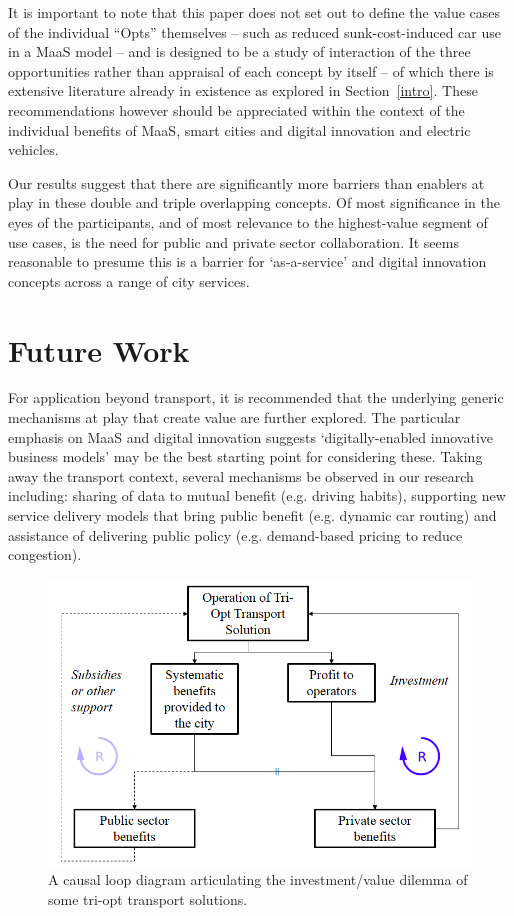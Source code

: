 \documentclass[b5paper,10pt]{article}
\begin{document}
It is important to note that this paper does not set out to define the
value cases of the individual ``Opts'' themselves -- such as reduced
sunk-cost-induced car use in a MaaS model -- and is designed to be a
study of interaction of the three opportunities rather than appraisal
of each concept by itself -- of which there is extensive literature
already in existence as explored in Section~\ref{intro}. These
recommendations however should be appreciated within the context of
the individual benefits of MaaS, smart cities and digital innovation
and electric vehicles.

Our results suggest that there are significantly more barriers than
enablers at play in these double and triple overlapping concepts. Of
most significance in the eyes of the participants, and of most
relevance to the highest-value segment of use cases, is the need for
public and private sector collaboration. It seems reasonable to
presume this is a barrier for `as-a-service' and digital innovation
concepts across a range of city services.

\section{Future Work}\label{future}

For application beyond transport, it is recommended that the
underlying generic mechanisms at play that create value are further
explored. The particular emphasis on MaaS and digital innovation
suggests `digitally-enabled innovative business models' may be the
best starting point for considering these. Taking away the transport
context, several mechanisms be observed in our research including:
sharing of data to mutual benefit (e.g. driving habits), supporting
new service delivery models that bring public benefit (e.g. dynamic
car routing) and assistance of delivering public policy
(e.g. demand-based pricing to reduce congestion).

\begin{figure}[!h]
\centering
\includegraphics[width=0.7\columnwidth]{images/causalloop.png}
\caption{A causal loop diagram articulating the investment/value
  dilemma of some tri-opt transport solutions.}
\label{fig:causalloop}
\end{figure}
\end{document}
